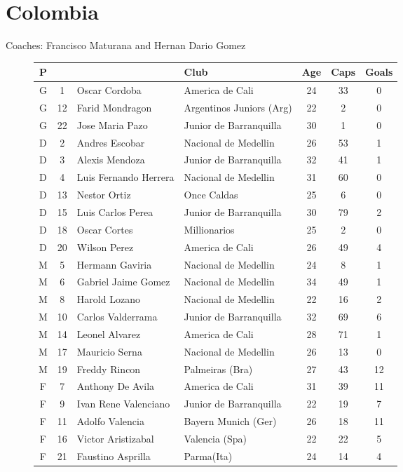 \chapter{Colombia}
\newline
\newline
Coaches: Francisco Maturana and Hernan Dario Gomez
\begin{figure}[H]
\small
\begin{tabular}{c c l l c c c}
P & & & Club & Age & Caps & Goals \\ \hline
G & 1 & Oscar Cordoba & America de Cali & 24 & 33 & 0 \\
G & 12 & Farid Mondragon & Argentinos Juniors (Arg) & 22 & 2 & 0 \\
G & 22 & Jose Maria Pazo & Junior de Barranquilla & 30 & 1 & 0 \\ \hline
D & 2 & Andres Escobar & Nacional de Medellin & 26 & 53 & 1 \\
D & 3 & Alexis Mendoza & Junior de Barranquilla & 32 & 41 & 1 \\
D & 4 & Luis Fernando Herrera & Nacional de Medellin & 31 & 60 & 0 \\
D &13 & Nestor Ortiz & Once Caldas & 25 & 6 & 0 \\
D &15 & Luis Carlos Perea & Junior de Barranquilla & 30 & 79 & 2 \\
D &18 & Oscar Cortes & Millionarios & 25 & 2 & 0 \\
D & 20 & Wilson Perez & America de Cali & 26 & 49 & 4 \\ \hline
M & 5 & Hermann Gaviria &  Nacional de Medellin &  24 & 8 & 1 \\ 
M & 6 & Gabriel Jaime Gomez & Nacional de Medellin & 34 & 49 & 1 \\
M & 8 & Harold Lozano & Nacional de Medellin & 22 & 16 & 2 \\
M &10 & Carlos Valderrama & Junior de Barranquilla & 32 & 69 & 6 \\
M &14 & Leonel Alvarez & America de Cali & 28 & 71 & 1 \\
M &17 & Mauricio Serna & Nacional de Medellin & 26 & 13 & 0 \\
M &19 & Freddy Rincon & Palmeiras (Bra) & 27 & 43 & 12 \\ \hline
F & 7 & Anthony De Avila & America de Cali & 31 & 39 & 11 \\
F & 9 & Ivan Rene Valenciano & Junior de Barranquilla & 22 & 19 & 7 \\
F & 11 & Adolfo Valencia &  Bayern Munich (Ger) & 26 & 18 & 11 \\
F & 16 & Victor Aristizabal & Valencia (Spa) & 22 & 22 & 5 \\
F & 21 & Faustino Asprilla & Parma(Ita) & 24 & 14 & 4 \\ \hline
\end{tabular}
\normalsize
\end{figure}
